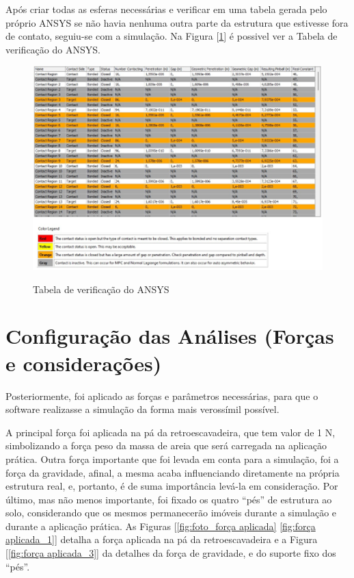 \documentclass[deposito, acronym, symbols]{fei}
\begin{document}
Após criar todas as esferas necessárias e verificar em uma tabela gerada pelo próprio ANSYS se não havia nenhuma outra parte da estrutura que estivesse fora de contato, seguiu-se com a simulação. Na Figura [\ref{fig: verificação do ANSYS}] é possivel ver a Tabela de verificação do ANSYS.

 \begin{figure}[!htb]
 \centering
    \caption{Tabela de verificação do ANSYS}
    \includegraphics[width=1\linewidth]{Imagens/verificação do ANSYS.png}
    \label{fig: verificação do ANSYS}
 \end{figure}
 
\newpage

\section{Configuração das Análises (Forças e considerações)}

Posteriormente, foi aplicado as forças e parâmetros necessárias, para que o software realizasse a simulação da forma mais verossímil possível.

A principal força foi aplicada na pá da retroescavadeira, que tem valor de 1 N, simbolizando a força peso da massa de areia que será carregada na aplicação prática. Outra força importante que foi levada em conta para a simulação, foi a força da gravidade, afinal, a mesma acaba influenciando diretamente na própria estrutura real, e, portanto, é de suma importância levá-la em consideração. Por último, mas não menos importante, foi fixado os quatro “pés” de estrutura ao solo, considerando que os mesmos permanecerão imóveis durante a simulação e durante a aplicação prática. As Figuras [\ref{fig:foto_força aplicada} \ref{fig:força aplicada_1}] detalha a força aplicada na pá da retroescavadeira e a Figura [\ref{fig:força aplicada_3}] da detalhes da força de gravidade, e do suporte fixo dos “pés”.
\end{document}
